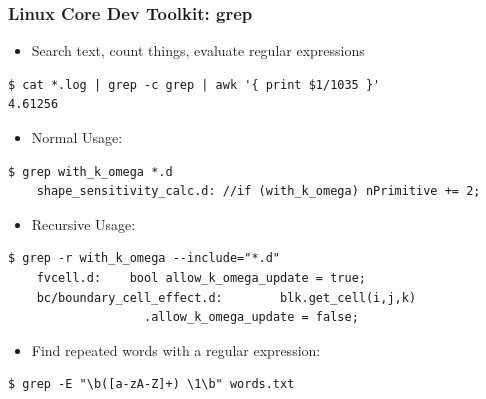 \documentclass[landscape,10pt]{beamer}
\begin{document}
\begin{frame}[fragile]
\frametitle{Linux Core Dev Toolkit: grep}
\begin{itemize}
\item Search text, count things, evaluate regular expressions
\end{itemize}

\begin{verbatim}
$ cat *.log | grep -c grep | awk '{ print $1/1035 }' 
4.61256
\end{verbatim}

\begin{itemize}
\item Normal Usage: 
\end{itemize}
\begin{scriptsize}
\begin{verbatim}
$ grep with_k_omega *.d
    shape_sensitivity_calc.d: //if (with_k_omega) nPrimitive += 2;
\end{verbatim}
\end{scriptsize}

\begin{itemize}
\item Recursive Usage: 
\end{itemize}
\begin{scriptsize}
\begin{verbatim}
$ grep -r with_k_omega --include="*.d"
    fvcell.d:    bool allow_k_omega_update = true;
    bc/boundary_cell_effect.d:        blk.get_cell(i,j,k)
                   .allow_k_omega_update = false;
\end{verbatim}
\end{scriptsize}

\begin{itemize}
\item Find repeated words with a regular expression:
\end{itemize}
\begin{verbatim}
$ grep -E "\b([a-zA-Z]+) \1\b" words.txt
\end{verbatim}
\end{frame}
\end{document}
